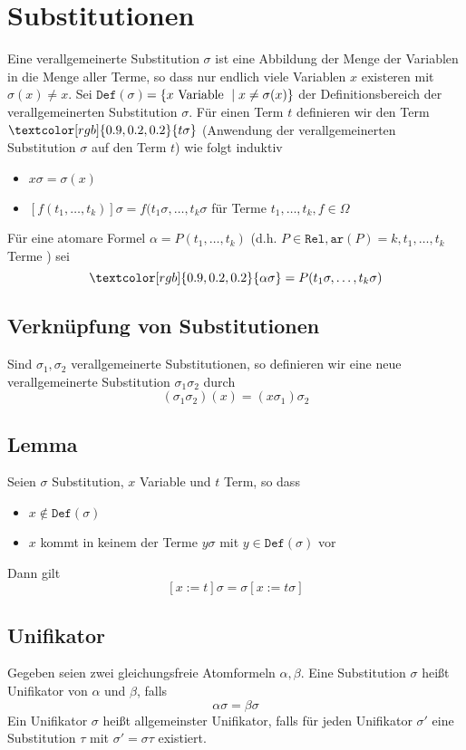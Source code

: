 \documentclass[12pt,a4paper]{report}
\newcommand{\ls}{\newline\newline}
\newcommand{\red}[1]{\textcolor[rgb]{0.9,0.2,0.2}{#1}}
\newcommand{\green}[1]{\textcolor[rgb]{0.1,0.6,0.1}{#1}}
\newcommand{\blue}[1]{\textcolor[rgb]{0.2,0.2,1}{#1}}
\begin{document}
\section{\blue{Substitutionen}}
Eine \red{verallgemeinerte Substitution} $ \sigma $ ist eine Abbildung der Menge der Variablen in die Menge aller Terme, so dass nur endlich viele Variablen $ x $ existeren mit $ \sigma(x) \neq x$.\ls
Sei \red{$ \texttt{Def}(\sigma) $}$ = \{ x \textnormal{ Variable } \mid x \neq \sigma(x) \} $ der \red{Definitionsbereich} der verallgemeinerten Substitution $ \sigma $.
Für einen Term $ t $ definieren wir den Term $ \red{t \sigma} $ (Anwendung der verallgemeinerten Substitution $ \sigma $ auf den Term $ t $) wie folgt induktiv
\begin{itemize}
    \item $ x \sigma = \sigma(x) $
    \item $ [f(t_1,\dots,t_k)]\sigma = f(t_1\sigma,\dots,t_k \sigma $ für Terme $ t_1,\dots,t_k, f \in \Omega $
\end{itemize}
Für eine atomare Formel $ \alpha = P(t_1,\dots, t_k) $ (d.h. $ P \in \texttt{Rel}, \texttt{ar}(P) =k, t_1,\dots,t_k $ Terme ) sei
\[
    \red{\alpha \sigma} = P(t_1 \sigma,\dots, t_k \sigma)
\]
\subsection{\blue{Verknüpfung von Substitutionen}}
Sind $ \sigma_1, \sigma_2 $ verallgemeinerte Substitutionen, so definieren wir eine neue verallgemeinerte Substitution \red{$ \sigma_1 \sigma_2 $} durch
\[
    (\sigma_1 \sigma_2)(x) = (x\sigma_1)\sigma_2
\]
\subsection{\green{Lemma}}
Seien $ \sigma $ Substitution, $ x $ Variable und $ t $ Term, so dass
\begin{itemize}
    \item $ x \notin \texttt{Def}(\sigma) $
    \item $ x $ kommt in keinem der Terme $ y \sigma $ mit $ y \in \texttt{Def}(\sigma) $ vor
\end{itemize}
Dann gilt
\[
    [x:=t]\sigma = \sigma[x:=t\sigma]
\]
\subsection{\blue{Unifikator}}
Gegeben seien zwei gleichungsfreie Atomformeln $ \alpha, \beta $. Eine Substitution $ \sigma $ heißt \red{Unifikator} von $ \alpha $ und $ \beta $, falls
\[
    \alpha\sigma = \beta\sigma
\]
Ein Unifikator $ \sigma $ heißt \red{allgemeinster Unifikator}, falls für jeden Unifikator $ \sigma' $ eine Substitution $ \tau $ mit $ \sigma' = \sigma \tau $ existiert.
\end{document}
